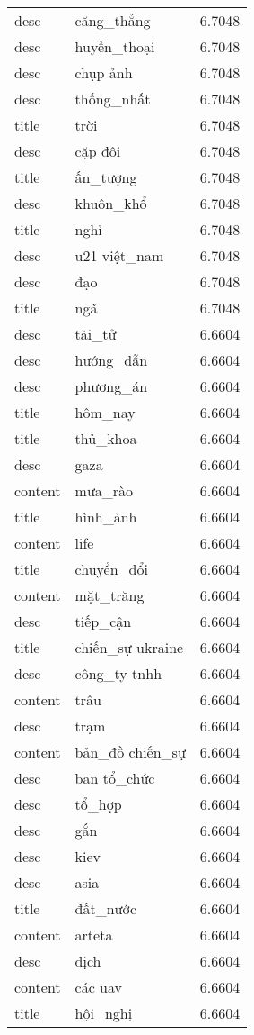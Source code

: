 \documentclass{article}
\begin{document}
\begin{tabular}{lll}
desc & căng\_thẳng & 6.7048\\
desc & huyền\_thoại & 6.7048\\
desc & chụp ảnh & 6.7048\\
desc & thống\_nhất & 6.7048\\
title & trời & 6.7048\\
desc & cặp đôi & 6.7048\\
title & ấn\_tượng & 6.7048\\
desc & khuôn\_khổ & 6.7048\\
title & nghỉ & 6.7048\\
desc & u21 việt\_nam & 6.7048\\
desc & đạo & 6.7048\\
title & ngã & 6.7048\\
desc & tài\_tử & 6.6604\\
desc & hướng\_dẫn & 6.6604\\
desc & phương\_án & 6.6604\\
title & hôm\_nay & 6.6604\\
title & thủ\_khoa & 6.6604\\
desc & gaza & 6.6604\\
content & mưa\_rào & 6.6604\\
title & hình\_ảnh & 6.6604\\
content & life & 6.6604\\
title & chuyển\_đổi & 6.6604\\
content & mặt\_trăng & 6.6604\\
desc & tiếp\_cận & 6.6604\\
title & chiến\_sự ukraine & 6.6604\\
desc & công\_ty tnhh & 6.6604\\
content & trâu & 6.6604\\
desc & trạm & 6.6604\\
content & bản\_đồ chiến\_sự & 6.6604\\
desc & ban tổ\_chức & 6.6604\\
desc & tổ\_hợp & 6.6604\\
desc & gắn & 6.6604\\
desc & kiev & 6.6604\\
desc & asia & 6.6604\\
title & đất\_nước & 6.6604\\
content & arteta & 6.6604\\
desc & dịch & 6.6604\\
content & các uav & 6.6604\\
title & hội\_nghị & 6.6604\\

\end{tabular}
\end{document}
